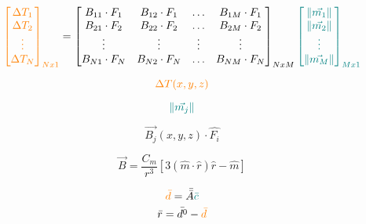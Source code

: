 \begin{equation}
\textcolor{orange}{\begin{bmatrix}
    \Delta T_1 \\ \Delta T_2 \\ \vdots \\ \Delta T_N
\end{bmatrix}_{Nx1}} = \begin{bmatrix}
    B_{11} \cdot F_{1} & B_{12} \cdot F_{1} & \hdots & B_{1M} \cdot F_{1} \\
    B_{21} \cdot F_{2} & B_{22} \cdot F_{2} & \hdots & B_{2M} \cdot F_{2} \\
    \vdots & \vdots & \vdots & \vdots \\
    B_{N1} \cdot F_{N} & B_{N2} \cdot F_{N} & \hdots & B_{NM} \cdot F_{N} \\
\end{bmatrix}_{NxM} \textcolor{teal}{\begin{bmatrix}
    \left\lVert \vec{m_1} \right\rVert \\ \left\lVert \vec{m_2} \right\rVert \\ \vdots \\ \left\lVert \vec{m_M} \right\rVert
\end{bmatrix}_{Mx1}}
\end{equation}

\begin{equation}
    \textcolor{orange}{\Delta T (x, y, z)}
\end{equation}

\begin{equation}
  \textcolor{teal}{\left\lVert \vec{m_j} \right\rVert}  
\end{equation}

\begin{equation}
    \vec{B_j}(x, y, z) \cdot \hat{F_i}
\end{equation}

\begin{equation}
    \vec{B} = \frac{C_m}{r^3} [3 ( \hat{m} \cdot \hat{r}) \hat{r} - \hat{m}]
\end{equation}

\begin{equation}
    \textcolor{orange}{\Bar{d}} = \Bar{\Bar{A}} \textcolor{teal}{\Bar{c}}
\end{equation}
\begin{equation}
    \bar{r} = \bar{d^0} - \textcolor{orange}{\bar{d}}
\end{equation}


